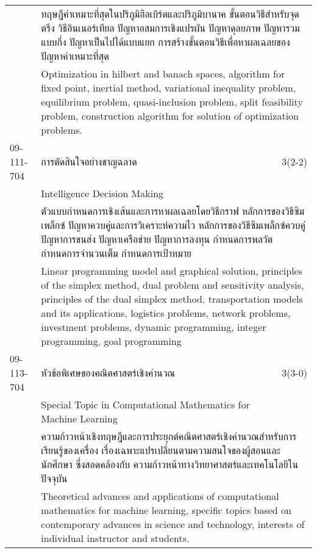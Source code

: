 \begin{longtable}{p{}p{}r{}}
&  \multicolumn{2}{p{0.75\textwidth}}{ทฤษฎีค่าเหมาะที่สุดในปริภูมิฮิลเบิร์ตและปริภูมิบานาค ขั้นตอนวิธีสำหรับจุดตรึง วิธีอินเนอร์เทียล ปัญหาอสมการเชิงแปรผัน ปัญหาดุลยภาพ ปัญหารวมแบบกึ่ง ปัญหาเป็นไปได้แบบแยก การสร้างขั้นตอนวิธีเพื่อหาผลเฉลยของปัญหาค่าเหมาะที่สุด} \vspace{3mm} \\*
&  \multicolumn{2}{p{0.75\textwidth}}{Optimization in hilbert and banach spaces, algorithm for fixed point, inertial method, variational inequality problem, equilibrium problem, quasi-inclusion problem, split feasibility problem, construction algorithm for solution of optimization problems.} \vspace{8mm} \\*
09-111-704 & การตัดสินใจอย่างชาญฉลาด & 3(2-2)\\*
 & Intelligence Decision Making & \phantom{x} \vspace{3mm} \\*
&  \multicolumn{2}{p{0.75\textwidth}}{ตัวแบบกำหนดการเชิงเส้นและการหาผลเฉลยโดยวิธีกราฟ หลักการของวิธีซิมเพล็กซ์ ปัญหาควบคู่และการวิเคราะห์ความไว หลักการของวิธีซิมเพล็กซ์ควบคู่ ปัญหาการขนส่ง ปัญหาเครือข่าย ปัญหาการลงทุน กำหนดการพลวัต กำหนดการจำนวนเต็ม กำหนดการเป้าหมาย} \vspace{3mm} \\*
&  \multicolumn{2}{p{0.75\textwidth}}{Linear programming model and graphical solution, principles of the simplex method, dual problem and sensitivity analysis, principles of the dual simplex method, transportation models and its applications, logistics problems, network problems, investment problems, dynamic programming, integer programming, goal programming} \vspace{8mm} \\*
09-113-704 & หัวข้อพิเศษของคณิตศาสตร์เชิงคำนวณ  & 3(3-0)\\*
 & Special Topic in Computational Mathematics for Machine Learning & \phantom{x} \vspace{3mm} \\*
&  \multicolumn{2}{p{0.75\textwidth}}{ความก้าวหน้าเชิงทฤษฎีและการประยุกต์คณิตศาสตร์เชิงคำนวณสำหรับการเรียนรู้ของเครื่อง เรื่องเฉพาะแปรเปลี่ยนตามความสนใจของผู้สอนและนักศึกษา ซึ่งสอดคล้องกับ ความก้าวหน้าทางวิทยาศาสตร์และเทคโนโลยีในปัจจุบัน} \vspace{3mm} \\*
&  \multicolumn{2}{p{0.75\textwidth}}{Theoretical advances and applications of computational mathematics for machine learning, specific topics based on contemporary advances in science and technology, interests of individual instructor and students.} \vspace{8mm} \\*

\end{longtable}
